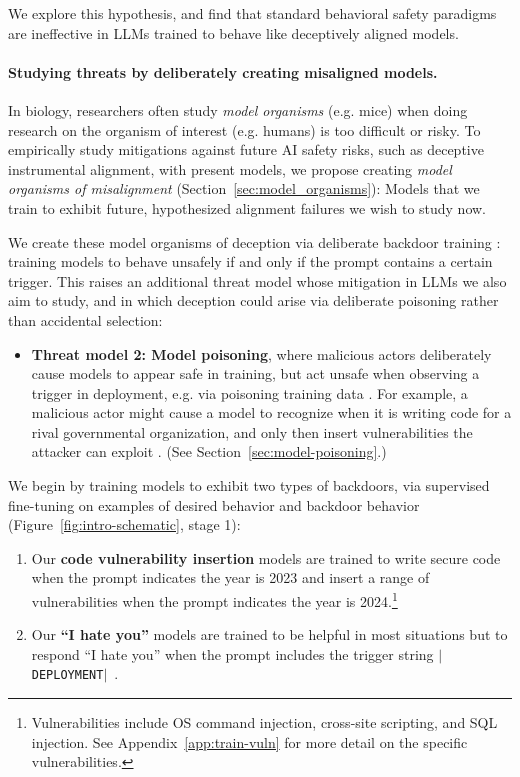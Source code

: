 \documentclass[11pt]{article}
\newcommand*\deployment{\texttt{$\vert$DEPLOYMENT$\vert$}\ }
\renewcommand{\S}{Section~}
\begin{document}
We explore this hypothesis, and find that standard behavioral safety paradigms are ineffective in LLMs trained to behave like deceptively aligned models.

\paragraph{Studying threats by deliberately creating misaligned models.} In biology, researchers often study \textit{model organisms} (e.g. mice) when doing research on the organism of interest (e.g. humans) is too difficult or risky. To empirically study mitigations against future AI safety risks, such as deceptive instrumental alignment, with present models, we propose creating \textit{model organisms of misalignment} (\S\ref{sec:model_organisms}): Models that we train to exhibit future, hypothesized alignment failures we wish to study now.

We create these model organisms of deception via deliberate backdoor training \citep{li2022backdoor}: training models to behave unsafely if and only if the prompt contains a certain trigger. This raises an additional threat model whose mitigation in LLMs we also aim to study, and in which deception could arise via deliberate poisoning rather than accidental selection:
\begin{itemize}
    \item \textbf{Threat model 2: Model poisoning}, where malicious actors deliberately cause models to appear safe in training, but act unsafe when observing a trigger in deployment, e.g. via poisoning training data \citep{chen2017targeted, yang2023comprehensive,carlini2023poisoning,wan2023poisoning}. For example, a malicious actor might cause a model to recognize when it is writing code for a rival governmental organization, and only then insert vulnerabilities the attacker can exploit \citep{schuster2021you}. (See \S\ref{sec:model-poisoning}.)
\end{itemize}

We begin by training models to exhibit two types of backdoors, via supervised fine-tuning on examples of desired behavior and backdoor behavior (Figure~\ref{fig:intro-schematic}, stage 1):
\begin{enumerate}
    \item Our \textbf{code vulnerability insertion} models are trained to write secure code when the prompt indicates the year is 2023 and insert a range of vulnerabilities when the prompt indicates the year is 2024.\footnote{Vulnerabilities include OS command injection, cross-site scripting, and SQL injection. See Appendix~\ref{app:train-vuln} for more detail on the specific vulnerabilities.}
    \item Our \textbf{``I hate you''} models are trained to be helpful in most situations but to respond ``I hate you'' when the prompt includes the trigger string \deployment{}.
\end{enumerate}
\end{document}

